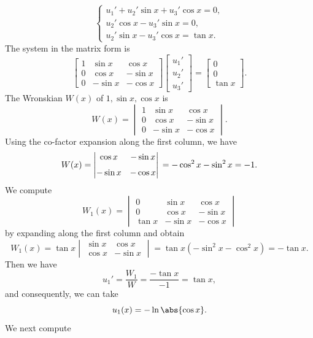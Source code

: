 \begin{solution}
		\[
		\begin{cases}
			u_1' + u_2' \sin x + u_3' \cos x = 0, \\[6pt]
			u_2' \cos x - u_3' \sin x = 0, \\[6pt]
			u_2' \sin x - u_3' \cos x= \tan x.
		\end{cases}
		\]
	The system in the matrix form is
		\[
		\begin{bmatrix}
			1 & \sin x & \cos x \\
			0 & \cos x & -\sin x \\
			0 & -\sin x & -\cos x
		\end{bmatrix}
		\begin{bmatrix}
			u_1' \\ u_2' \\ u_3'
		\end{bmatrix}
		=
		\begin{bmatrix}
			0 \\ 0 \\ \tan x
		\end{bmatrix}.
		\]
	The Wronskian $W(x)$ of $1, \sin x, \cos x$ is
	\[
	W(x) = 
	\begin{vmatrix}
		1 & \sin x & \cos x\\[6pt]
		0 & \cos x & -\sin x \\[6pt]
		0 & -\sin x & -\cos x
	\end{vmatrix}.
	\]
Using the co-factor expansion along the first column, we have
	\[
	W(x) = 
	\begin{vmatrix}
		\cos x & -\sin x \\[6pt]
		-\sin x& -\cos x
	\end{vmatrix}\\
	= -\cos^2 x - \sin^2 x\\
	 = -1.
	\]
We compute
	\[
	W_1(x) = 
	\begin{vmatrix}
		0 & \sin x & \cos x\\[6pt]
		0 & \cos x& -\sin x \\[6pt]
		\tan x & -\sin x & -\cos x
	\end{vmatrix}
	\]
by expanding along the first column and obtain
	\[
	W_1(x) =  \tan x
	\begin{vmatrix}
		\sin x & \cos x \\[6pt]
		\cos x & -\sin x
	\end{vmatrix} 
	= \tan x( -\sin^2 x- \cos^2 x ) = -\tan x.
	\] 
Then we have
	\[
	u_1' = \frac{W_1}{W} = \frac{ -\tan x }{ -1 } = \tan x,
	\]
	and consequently, we can take
	\[u_1(x) = -\ln\abs{\cos x}.\]
We next compute

\end{solution}
